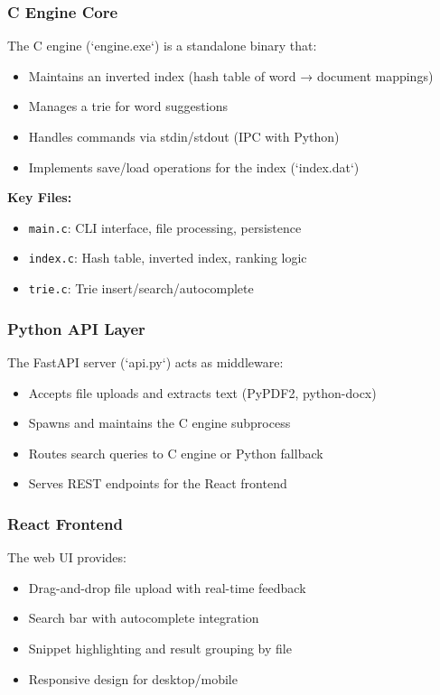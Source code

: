 \documentclass[12pt,a4paper]{article}
\begin{document}
\subsubsection{C Engine Core}
The C engine (`engine.exe`) is a standalone binary that:
\begin{itemize}
    \item Maintains an inverted index (hash table of word → document mappings)
    \item Manages a trie for word suggestions
    \item Handles commands via stdin/stdout (IPC with Python)
    \item Implements save/load operations for the index (`index.dat`)
\end{itemize}

\textbf{Key Files:}
\begin{itemize}
    \item \texttt{main.c}: CLI interface, file processing, persistence
    \item \texttt{index.c}: Hash table, inverted index, ranking logic
    \item \texttt{trie.c}: Trie insert/search/autocomplete
\end{itemize}

\subsubsection{Python API Layer}
The FastAPI server (`api.py`) acts as middleware:
\begin{itemize}
    \item Accepts file uploads and extracts text (PyPDF2, python-docx)
    \item Spawns and maintains the C engine subprocess
    \item Routes search queries to C engine or Python fallback
    \item Serves REST endpoints for the React frontend
\end{itemize}

\subsubsection{React Frontend}
The web UI provides:
\begin{itemize}
    \item Drag-and-drop file upload with real-time feedback
    \item Search bar with autocomplete integration
    \item Snippet highlighting and result grouping by file
    \item Responsive design for desktop/mobile
\end{itemize}
\end{document}
